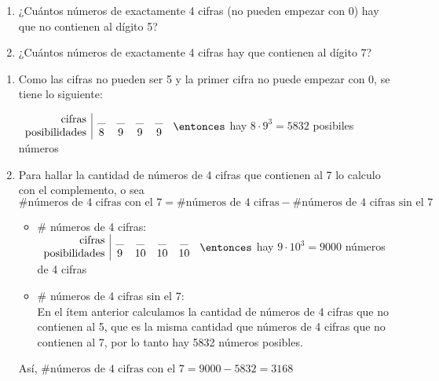 \ejercicio

\begin{enumerate}[label=\roman*)]
    \item ¿Cuántos números de exactamente 4 cifras (no pueden empezar con 0) hay que no contienen al dígito 5?
    \item ¿Cuántos números de exactamente 4 cifras hay que contienen al dígito 7?
\end{enumerate}

\separadorCorto

\begin{enumerate}[label=\roman*)]
    \item

    Como las cifras no pueden ser 5 y la primer cifra no puede empezar con 0, se tiene lo siguiente:

    $
        \begin{array}{r|cccc}
            \text{cifras} & \textunderscore & \textunderscore & \textunderscore & \textunderscore \\
            \text{posibilidades} & 8 & 9 & 9 & 9
        \end{array}
    $
    $\entonces$ hay $8 \cdot 9^3 = 5832$ posibiles números

    \item Para hallar la cantidad de números de 4 cifras que contienen al 7 lo calculo con el complemento, o sea\\

    $\# \text{números de 4 cifras con el 7} = \# \text{números de 4 cifras} - \# \text{números de 4 cifras sin el 7}$\\

    \begin{itemize}
        \item \# números de 4 cifras:\\

        $
            \begin{array}{r|cccc}
                \text{cifras} & \textunderscore & \textunderscore & \textunderscore & \textunderscore \\
                \text{posibilidades} & 9 & 10 & 10 & 10
            \end{array}
        $
        $\entonces$ hay $9 \cdot 10^3 = 9000$ números de 4 cifras

        \item \# números de 4 cifras sin el 7:\\
        En el ítem anterior calculamos la cantidad de números de 4 cifras que no contienen al 5, que es la misma cantidad que números de 4 cifras que no contienen al 7, por lo tanto hay 5832 números posibles.
    \end{itemize}

    Así, $\# \text{números de 4 cifras con el 7} = 9000 - 5832 = 3168$
\end{enumerate}